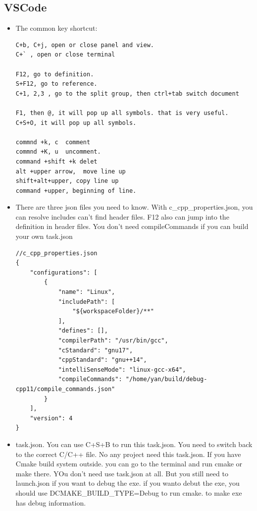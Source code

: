 \documentclass[a4paper,11pt,twoside]{book}
\begin{document}
\subsection{VSCode}
\begin{itemize}
    \item The common key shortcut:

\begin{lstlisting}[]
C+b, C+j, open or close panel and view. 
C+` , open or close terminal

F12, go to definition. 
S+F12, go to reference. 
C+1, 2,3 , go to the split group, then ctrl+tab switch document

F1, then @, it will pop up all symbols. that is very useful.
C+S+O, it will pop up all symbols. 

commnd +k, c  comment
commnd +K, u  uncomment.
command +shift +k delet
alt +upper arrow,  move line up
shift+alt+upper, copy line up
command +upper, beginning of line.

\end{lstlisting}

\item There are three json files you need to know. With c\_cpp\_properties.json, you can resolve includes can't find header files. F12 also can jump into the definition in header files. You don't need compileCommands if you can build your own task.json
    
\begin{lstlisting}[mathescape=false]
//c_cpp_properties.json
{
    "configurations": [
        {
            "name": "Linux",
            "includePath": [
                "${workspaceFolder}/**"
            ],
            "defines": [],
            "compilerPath": "/usr/bin/gcc",
            "cStandard": "gnu17",
            "cppStandard": "gnu++14",
            "intelliSenseMode": "linux-gcc-x64",
            "compileCommands": "/home/yan/build/debug-cpp11/compile_commands.json"
        }
    ],
    "version": 4
}
\end{lstlisting}

\item task.json. You can use C+S+B to run this task.json. You need to switch back to the correct C/C++ file. No any project need this task.json. If you have Cmake build system outside. you can go to the terminal and run cmake or make there. YOu don't need use task.json at all.  But you still need to launch.json if you want to debug the exe. if you wanto debut the exe, you should use DCMAKE\_BUILD\_TYPE=Debug to run cmake. to make exe has debug information. 


\end{itemize}
\end{document}
